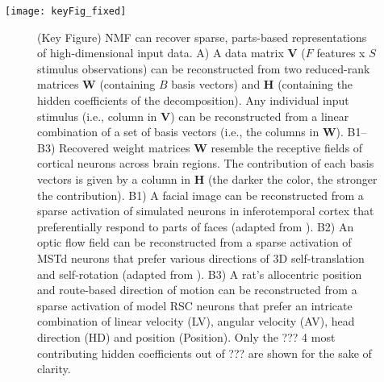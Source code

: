 \begin{figure*}[h]
	\centering
	\texttt{[image: keyFig\_fixed]}
	\label{fig:NMF|reconstruction}
\end{figure*}

\begin{figure}[t!]
	\centering
    \caption{(Key Figure) \ac{NMF} can recover sparse, parts-based
         representations of high-dimensional input data.
         A)  A data matrix \textbf{V} ($F$ features x $S$ stimulus
             observations) can be reconstructed from two reduced-rank
             matrices \textbf{W} (containing $B$ basis vectors) and 
             \textbf{H} (containing the hidden coefficients of the
             decomposition).
             Any individual input stimulus (i.e., column in \textbf{V})
             can be reconstructed from a linear combination of a set of
             basis vectors (i.e., the columns in \textbf{W}).
         B1--B3) Recovered weight matrices \textbf{W} resemble the
             receptive fields of cortical neurons across brain regions. The contribution of each basis vectors is given by a column 
             in \textbf{H} (the darker the color, the stronger the
             contribution).
         B1) A facial image can be reconstructed from a sparse activation
             of simulated neurons in inferotemporal cortex that
             preferentially respond to parts of faces
             (adapted from \cite{LeeSeung1999}).
         B2) An optic flow field can be reconstructed from a sparse
             activation of \ac{MSTd} neurons that prefer various
             directions of 3D self-translation and self-rotation
             (adapted from \cite{Beyeler2016}).
         B3) A rat's allocentric position and route-based direction of
             motion can be reconstructed from a sparse activation of
             model \ac{RSC} neurons that prefer an intricate combination of
             linear velocity (LV), angular velocity (AV), head direction (HD)
             and position (Position). Only the ??? 4 most contributing hidden coefficients out of ??? are shown for the
             sake of clarity.}
	\label{fig:NMF|reconstruction}
\end{figure}


